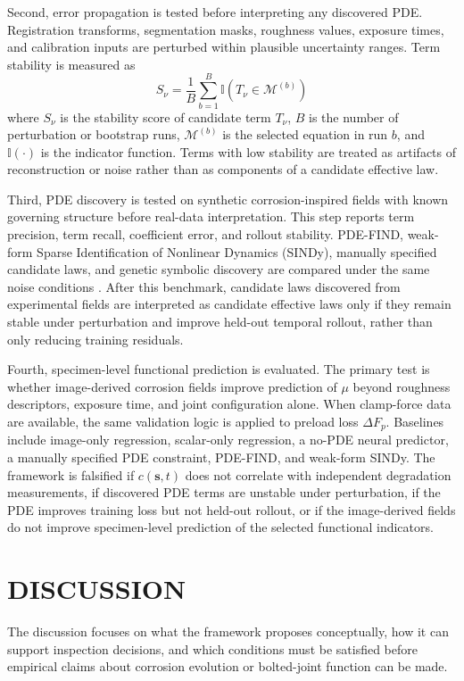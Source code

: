 \documentclass[colorlinks,upint,subscriptcorrection,varvw,hyphenate,balance]{asmeconf}
\newcommand{\vect}[1]{\bm{#1}}
\begin{document}
Second, error propagation is tested before interpreting any discovered PDE.
Registration transforms, segmentation masks, roughness values, exposure times,
and calibration inputs are perturbed within plausible uncertainty ranges. Term
stability is measured as
\begin{equation}
    S_{\nu}=\frac{1}{B}\sum_{b=1}^{B}
    \mathbb{I}\left(T_{\nu}\in\mathcal{M}^{(b)}\right)
    \label{eq:termstability}
\end{equation}
where $S_{\nu}$ is the stability score of candidate term $T_{\nu}$, $B$ is the
number of perturbation or bootstrap runs, $\mathcal{M}^{(b)}$ is the selected
equation in run $b$, and $\mathbb{I}(\cdot)$ is the indicator function. Terms
with low stability are treated as artifacts of reconstruction or noise rather
than as components of a candidate effective law.

Third, PDE discovery is tested on synthetic corrosion-inspired fields with
known governing structure before real-data interpretation. This step reports
term precision, term recall, coefficient error, and rollout stability.
PDE-FIND, weak-form Sparse Identification of Nonlinear Dynamics (SINDy),
manually specified candidate laws, and genetic
symbolic discovery are compared under the same noise conditions
\cite{rudy2017pdefind,messenger2021wsindy,xu2020dlga}. After this benchmark,
candidate laws discovered from experimental fields are interpreted as
candidate effective laws only if they remain stable under perturbation and
improve held-out temporal rollout, rather than only reducing training
residuals.

Fourth, specimen-level functional prediction is evaluated. The primary test is
whether image-derived corrosion fields improve prediction of $\mu$ beyond
roughness descriptors, exposure time, and joint configuration alone. When
clamp-force data are available, the same validation logic is applied to preload
loss $\Delta F_p$. Baselines include image-only regression, scalar-only
regression, a no-PDE neural predictor, a manually specified PDE constraint,
PDE-FIND, and weak-form SINDy. The framework is falsified if
$c(\vect{s},t)$ does not correlate with independent degradation measurements,
if discovered PDE terms are unstable under perturbation, if the PDE improves
training loss but not held-out rollout, or if the image-derived fields do not
improve specimen-level prediction of the selected functional indicators.

\section{DISCUSSION}
The discussion focuses on what the framework
proposes conceptually, how it can support inspection decisions, and which conditions must be satisfied before empirical claims about corrosion evolution or bolted-joint function can be made.
\end{document}
